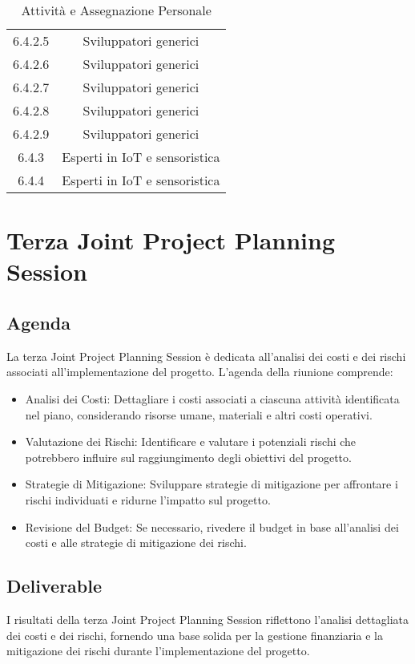 \begin{table}[h]
\begin{tabular}{|c|c|}
        6.4.2.5           & Sviluppatori generici                                    \\
        6.4.2.6           & Sviluppatori generici                                    \\
        6.4.2.7           & Sviluppatori generici                                    \\
        6.4.2.8           & Sviluppatori generici                                    \\
        6.4.2.9           & Sviluppatori generici                                    \\
        6.4.3             & Esperti in IoT e sensoristica                            \\
        6.4.4             & Esperti in IoT e sensoristica                            \\
    \end{tabular}
    \caption{Attività e Assegnazione Personale}
    \label{tab:attivita-personale}
\end{table}

\section{Terza Joint Project Planning Session}

\subsection{Agenda}

La terza Joint Project Planning Session è dedicata all'analisi dei costi e dei rischi associati all'implementazione del progetto. L'agenda della riunione comprende:

\begin{itemize}
    \item Analisi dei Costi: Dettagliare i costi associati a ciascuna attività identificata nel piano, considerando risorse umane, materiali e altri costi operativi.
    \item Valutazione dei Rischi: Identificare e valutare i potenziali rischi che potrebbero influire sul raggiungimento degli obiettivi del progetto.
    \item Strategie di Mitigazione: Sviluppare strategie di mitigazione per affrontare i rischi individuati e ridurne l'impatto sul progetto.
    \item Revisione del Budget: Se necessario, rivedere il budget in base all'analisi dei costi e alle strategie di mitigazione dei rischi.
\end{itemize}

\subsection{Deliverable}

I risultati della terza Joint Project Planning Session riflettono l'analisi dettagliata dei costi e dei rischi, fornendo una base solida per la gestione finanziaria e la mitigazione dei rischi durante l'implementazione del progetto.